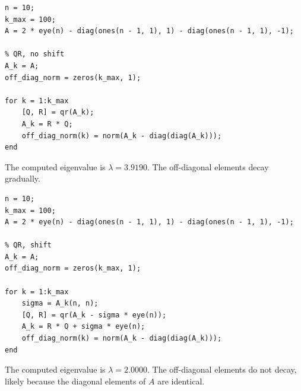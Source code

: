 \documentclass{article}
\begin{document}
\begin{lstlisting}
n = 10;
k_max = 100;
A = 2 * eye(n) - diag(ones(n - 1, 1), 1) - diag(ones(n - 1, 1), -1);

% QR, no shift
A_k = A;
off_diag_norm = zeros(k_max, 1);

for k = 1:k_max
    [Q, R] = qr(A_k);
    A_k = R * Q;
    off_diag_norm(k) = norm(A_k - diag(diag(A_k)));
end
\end{lstlisting}
The computed eigenvalue is $\lambda = 3.9190$. The off-diagonal elements decay gradually.

\begin{lstlisting}
n = 10;
k_max = 100;
A = 2 * eye(n) - diag(ones(n - 1, 1), 1) - diag(ones(n - 1, 1), -1);

% QR, shift
A_k = A;
off_diag_norm = zeros(k_max, 1);

for k = 1:k_max
    sigma = A_k(n, n);
    [Q, R] = qr(A_k - sigma * eye(n));
    A_k = R * Q + sigma * eye(n);
    off_diag_norm(k) = norm(A_k - diag(diag(A_k)));
end
\end{lstlisting}
The computed eigenvalue is $\lambda = 2.0000$. The off-diagonal elements do not decay, likely because the diagonal elements of $A$ are identical.
\end{document}
